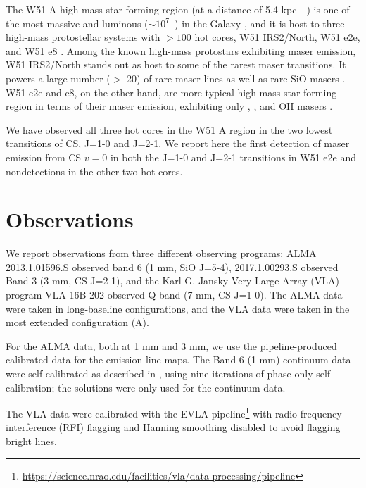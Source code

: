 \documentclass[twocolumn]{aastex62}
\begin{document}
The W51 A high-mass star-forming region (at a distance of 5.4 kpc -
\citealt{Sato2010a}) is one of the most massive and luminous ($\sim10^7$~\lsun)
in the Galaxy \citep{Ginsburg2017b}, and it is host to three high-mass
protostellar systems with $>100$ \msun hot cores, W51 IRS2/North, W51 e2e, and W51 e8
\citep{Ginsburg2017a}.  Among the known high-mass protostars exhibiting maser
emission, W51 IRS2/North stands out as host to some of the rarest maser transitions.
It powers a large number ($>$ 20) of rare \ammonia maser lines as well as rare
SiO masers \citep{Henkel2013a,Goddi2015a,Hasegawa1986a,Eisner2002a}.  W51 e2e and e8, on
the other hand, are more typical high-mass star-forming region in terms of
their maser emission, exhibiting only \methanol, \water, and OH masers
\citep{Goddi2016a}.

We have observed all three hot cores in the W51 A region in the two lowest
transitions of CS, J=1-0 and J=2-1.  We report here the first detection of
maser emission from CS $v=0$ in both the J=1-0 and J=2-1 transitions in
W51 e2e and nondetections in the other two hot cores.



\section{Observations}
\label{sec:observations}
We report observations from three different observing programs: ALMA
2013.1.01596.S \citep{Goddi2018a} observed band 6 (1 mm, SiO J=5-4),
2017.1.00293.S observed Band 3 (3 mm, CS J=2-1), and the Karl G. Jansky Very
Large Array (VLA) program VLA 16B-202 observed Q-band (7 mm, CS J=1-0).  The
ALMA data were taken in long-baseline configurations, and the VLA data were
taken in the most extended configuration (A).

For the ALMA data, both at 1 mm and 3 mm, we use the pipeline-produced
calibrated data for the emission line maps.  The Band 6 (1 mm) continuum data
were self-calibrated as described in \citet{Goddi2018a}, using  nine iterations
of phase-only self-calibration; the solutions were only used for the continuum
data.  

The VLA data were calibrated with the EVLA
pipeline\footnote{\url{https://science.nrao.edu/facilities/vla/data-processing/pipeline}}
with radio frequency interference (RFI) flagging and Hanning smoothing disabled
to avoid flagging bright lines.
\end{document}
